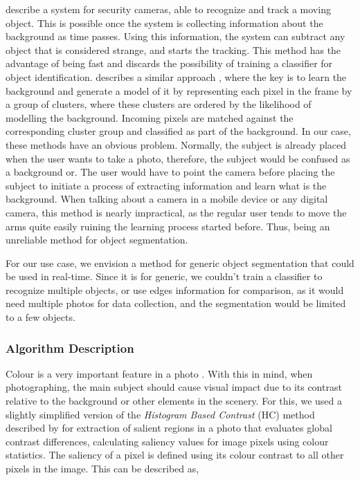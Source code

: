 \citeauthor{yang2004real} \cite{yang2004real} describe a system for security cameras, able to recognize and track a moving object. This is possible once the system is collecting information about the background as time passes. Using this information, the system can subtract any object that is considered strange, and starts the tracking. This method has the advantage of being fast and discards the possibility of training a classifier for object identification. 
\citeauthor{butler2003real} describes a similar approach \cite{butler2003real}, where the key is to learn the background and generate a model of it by representing each pixel in the frame by a group of clusters, where these clusters are ordered by the likelihood of modelling the background. Incoming pixels are matched against the corresponding cluster group and classified as part of the background.
In our case, these methods have an obvious problem. Normally, the subject is already placed when the user wants to take a photo, therefore, the subject would be confused as a background or. The user would have to point the camera before placing the subject to initiate a process of extracting information and learn what is the background. When talking about a  camera in a mobile device or any digital camera, this method is nearly impractical, as the regular user tends to move the arms quite easily ruining the learning process started before. Thus, being an unreliable method for object segmentation.

For our use case, we envision a method for generic object segmentation that could be used in real-time. Since it is for generic, we couldn't train a classifier to recognize multiple objects, or use edges information for comparison, as it would need multiple photos for data collection, and the segmentation would be limited to a few objects. 

\subsubsection{Algorithm Description}
\label{subsub:seg_algorithm}

Colour is a very important feature in a photo \cite{kamps2012rules, Santos}. With this in mind, when photographing, the main subject should cause visual impact due to its contrast relative to the background or other elements in the scenery. For this, we used a slightly simplified version of the \emph{Histogram Based Contrast} (HC) method described by \citeauthor{cheng2011global} \cite{cheng2011global} for extraction of salient regions in a photo that evaluates global contrast differences, calculating saliency values for image pixels using colour statistics. The saliency of a pixel is defined using its colour contrast to all other pixels in the image. This can be described as,

